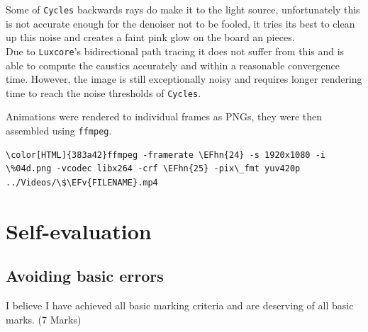 \documentclass[11pt]{article}
\newcommand{\EFv}[1]{\textcolor{EFv}{#1}} %
\newcommand{\EFhn}[1]{\textcolor{EFhn}{\textbf{#1}}} %
\begin{document}
Some of \texttt{Cycles} backwards rays do make it to the light source, unfortunately
this is not accurate enough for the denoiser not to be fooled, it tries its best
to clean up this noise and creates a faint pink glow on the board an pieces.\\

Due to \texttt{Luxcore}'s bidirectional path tracing it does not suffer from this and
is able to compute the caustics accurately and within a reasonable convergence
time. However, the image is still exceptionally noisy and requires longer
rendering time to reach the noise thresholds of \texttt{Cycles}.

Animations were rendered to individual frames as PNGs, they were then assembled
using \texttt{ffmpeg}.
\begin{Code}
\begin{Verbatim}[]
\color[HTML]{383a42}ffmpeg -framerate \EFhn{24} -s 1920x1080 -i \%04d.png -vcodec libx264 -crf \EFhn{25} -pix\_fmt yuv420p ../Videos/\$\EFv{FILENAME}.mp4
\end{Verbatim}
\end{Code}
\section{Self-evaluation}
\label{sec:orgeb936ed}
\subsection{Avoiding basic errors}
\label{sec:org2686d70}
I believe I have achieved all basic marking criteria and are deserving of all
basic marks. (7 Marks)
\end{document}
